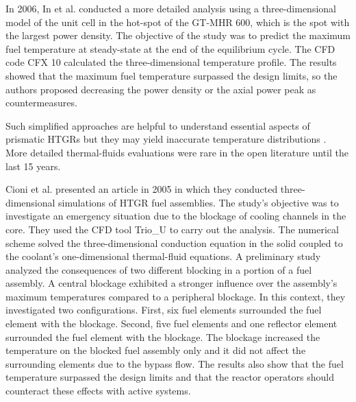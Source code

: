 In 2006, In et al. \cite{in_three-dimensional_2006} conducted a more detailed analysis using a three-dimensional model of the unit cell in the hot-spot of the GT-MHR 600, which is the spot with the largest power density.
The objective of the study was to predict the maximum fuel temperature at steady-state at the end of the equilibrium cycle.
The CFD code CFX 10 \cite{ansys_inc_cfx_2006} calculated the three-dimensional temperature profile.
The results showed that the maximum fuel temperature surpassed the design limits, so the authors proposed decreasing the power density or the axial power peak as countermeasures.

Such simplified approaches are helpful to understand essential aspects of prismatic HTGRs but they may yield inaccurate temperature distributions \cite{tak_numerical_2008}.
More detailed thermal-fluids evaluations were rare in the open literature until the last 15 years.

Cioni et al. \cite{cioni_3d_2005} presented an article in 2005 in which they conducted three-dimensional simulations of HTGR fuel assemblies.
The study's objective was to investigate an emergency situation due to the blockage of cooling channels in the core.
They used the \gls{CFD} tool Trio\_U \cite{bieder_priceles_2000} to carry out the analysis.
The numerical scheme solved the three-dimensional conduction equation in the solid coupled to the coolant's one-dimensional thermal-fluid equations.
A preliminary study analyzed the consequences of two different blocking in a portion of a fuel assembly.
A central blockage exhibited a stronger influence over the assembly's maximum temperatures compared to a peripheral blockage.
In this context, they investigated two configurations.
First, six fuel elements surrounded the fuel element with the blockage.
Second, five fuel elements and one reflector element surrounded the fuel element with the blockage.
The blockage increased the temperature on the blocked fuel assembly only and it did not affect the surrounding elements due to the bypass flow.
The results also show that the fuel temperature surpassed the design limits and that the reactor operators should counteract these effects with active systems.


